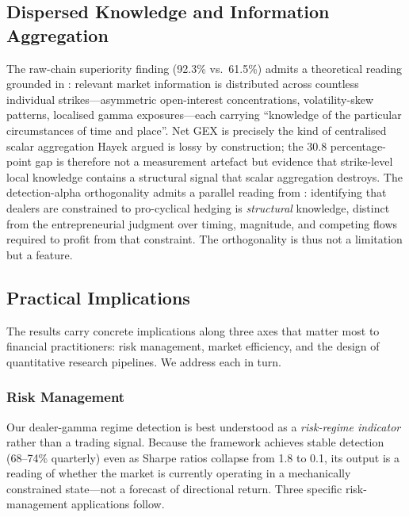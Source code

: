 \documentclass[jrfm,article,accept,moreauthors,pdftex]{Definitions/mdpi}
\begin{document}
\subsection{Dispersed Knowledge and Information Aggregation}

The raw-chain superiority finding (92.3\% vs.\ 61.5\%) admits a theoretical reading grounded in \citet{hayek1945}: relevant market information is distributed across countless individual strikes---asymmetric open-interest concentrations, volatility-skew patterns, localised gamma exposures---each carrying ``knowledge of the particular circumstances of time and place''. Net GEX is precisely the kind of centralised scalar aggregation Hayek argued is lossy by construction; the 30.8 percentage-point gap is therefore not a measurement artefact but evidence that strike-level local knowledge contains a structural signal that scalar aggregation destroys. The detection-alpha orthogonality admits a parallel reading from \citet{kirzner1973competition}: identifying that dealers are constrained to pro-cyclical hedging is \textit{structural} knowledge, distinct from the entrepreneurial judgment over timing, magnitude, and competing flows required to profit from that constraint. The orthogonality is thus not a limitation but a feature.

\subsection{Practical Implications}
\label{sec:discussion:practical}

The results carry concrete implications along three axes that matter
most to financial practitioners: risk management, market efficiency,
and the design of quantitative research pipelines. We address each in
turn.

\subsubsection{Risk Management}

Our dealer-gamma regime detection is best understood as a
\textit{risk-regime indicator} rather than a trading signal. Because
the framework achieves stable detection (68--74\% quarterly) even as
Sharpe ratios collapse from 1.8 to 0.1, its output is a reading of
whether the market is currently operating in a mechanically constrained
state---not a forecast of directional return. Three specific risk-management
applications follow.
\end{document}

